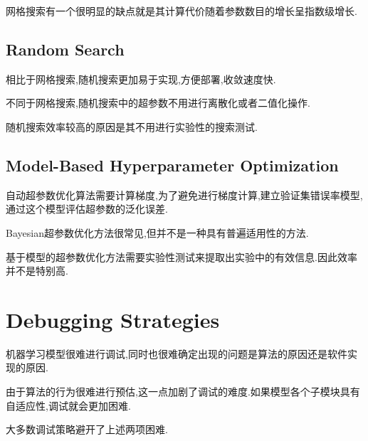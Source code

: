 网格搜索有一个很明显的缺点就是其计算代价随着参数数目的增长呈指数级增长.

\subsection{Random Search}

相比于网格搜索,随机搜索更加易于实现,方便部署,收敛速度快.

不同于网格搜索,随机搜索中的超参数不用进行离散化或者二值化操作.

随机搜索效率较高的原因是其不用进行实验性的搜索测试.

\subsection{Model-Based Hyperparameter Optimization}

自动超参数优化算法需要计算梯度,为了避免进行梯度计算,建立验证集错误率模型,通过这个模型评估超参数的泛化误差.

Bayesian超参数优化方法很常见,但并不是一种具有普遍适用性的方法.

基于模型的超参数优化方法需要实验性测试来提取出实验中的有效信息.因此效率并不是特别高.

\section{Debugging Strategies}

机器学习模型很难进行调试,同时也很难确定出现的问题是算法的原因还是软件实现的原因.

由于算法的行为很难进行预估,这一点加剧了调试的难度.如果模型各个子模块具有自适应性,调试就会更加困难.

大多数调试策略避开了上述两项困难.

